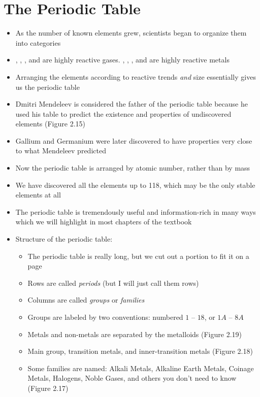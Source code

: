 \documentclass[12pt, openany, letterpaper]{memoir}
\begin{document}
\section{The Periodic Table}
\begin{itemize}
	\item As the number of known elements grew, scientists began to organize them into categories
	\item {}, , , and  are highly reactive gases. , , , and  are highly reactive metals
	\item Arranging the elements according to reactive trends \emph{and} size essentially gives us the periodic table
	\item Dmitri Mendeleev is considered the father of the periodic table because he used his table to predict the existence and properties of undiscovered elements (Figure 2.15)
	\item Gallium and Germanium were later discovered to have properties very close to what Mendeleev predicted
	\item Now the periodic table is arranged by atomic number, rather than by mass
	\item We have discovered all the elements up to 118, which may be the only stable elements at all
	\item The periodic table is tremendously useful and information-rich in many ways which we will highlight in most chapters of the textbook
	\item Structure of the periodic table:
	      \begin{itemize}
		      \item The periodic table is really long, but we cut out a portion to fit it on a page
		      \item Rows are called \emph{periods} (but I will just call them rows)
		      \item Columns are called \emph{groups} or \emph{families}
		      \item Groups are labeled by two conventions: numbered $1$ -- $18$, or $1A$ -- $8A$
		      \item Metals and non-metals are separated by the metalloids (Figure 2.19)
		      \item Main group, transition metals, and inner-transition metals (Figure 2.18)
		      \item Some families are named: Alkali Metals, Alkaline Earth Metals, Coinage Metals, Halogens, Noble Gases, and others you don't need to know (Figure 2.17)
	      \end{itemize}
\end{itemize}
\end{document}
